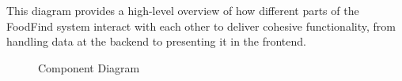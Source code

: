 \documentclass[12pt, a4paper, oneside]{article}
\begin{document}
This diagram provides a high-level overview of how different parts of the FoodFind system interact with each other to deliver cohesive functionality, from handling data at the backend to presenting it in the frontend.
\begin{figure}[H]
    \centering
    \caption{Component Diagram}
    \label{fig:component}
\end{figure}

\pagebreak




\end{document}
